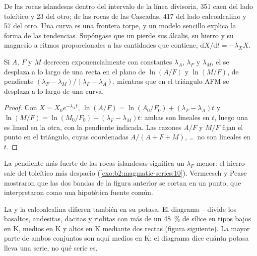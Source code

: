 De las rocas islandesas dentro del intervalo de la línea divisoria, 351 caen del lado
toleítico y 23 del otro; de las rocas de las Cascadas, 417 del lado calcoalcalino
y 57 del otro. Una curva es una frontera torpe, y un modelo sencillo explica
la forma de las tendencias. Supóngase que un  pierde sus álcalis, su hierro y su magnesio
a ritmos proporcionales a las cantidades que contiene, $\mathrm dX/\mathrm dt = -\lambda_X X$.

\begin{proposition}\label{prop:b2:magmatic-series:logratio}
Si $A$, $F$ y $M$ decrecen exponencialmente con constantes $\lambda_A$, $\lambda_F$ y
$\lambda_M$, el  se desplaza a lo largo de una recta en el plano de $\ln(A/F)$ y
$\ln(M/F)$, de pendiente $(\lambda_F - \lambda_M)/(\lambda_F - \lambda_A)$, mientras que en el triángulo AFM
se desplaza a lo largo de una curva.
\end{proposition}

\begin{proof}
Con $X = X_0 e^{-\lambda_X t}$, $\ln(A/F) = \ln(A_0/F_0) + (\lambda_F - \lambda_A)t$
y $\ln(M/F) = \ln(M_0/F_0) + (\lambda_F - \lambda_M)t$: ambas son lineales en $t$, luego
una es lineal en la otra, con la pendiente indicada. Las razones $A/F$ y $M/F$ fijan el
punto en el triángulo, cuyas coordenadas $A/(A + F + M)$, \dots\ no son lineales en $t$.
\end{proof}

La pendiente más fuerte de las rocas islandesas significa un $\lambda_F$ menor: el hierro sale
del  toleítico más despacio (\cref{exo:b2:magmatic-series:10}). Vermeesch y Pease mostraron que las dos
bandas de la figura anterior se cortan en un punto, que interpretaron como una hipotética fuente
común.

La  y la calcoalcalina difieren también en su potasa. El
diagrama -- divide los basaltos, andesitas, dacitas y riolitas con
más de un \qty{48}{\percent} de sílice en tipos bajos en K, medios en K y altos en K mediante dos
rectas (figura siguiente). La mayor parte de ambos conjuntos son aquí medios en K: el
diagrama dice cuánta potasa lleva una serie, no qué serie es.


